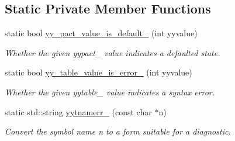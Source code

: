 \subsection*{Static Private Member Functions}
\begin{DoxyCompactItemize}
\item 
static bool \hyperlink{classyy_1_1CParser_a5f9d648c80542a6de735c18d99fa3633}{yy\-\_\-pact\-\_\-value\-\_\-is\-\_\-default\-\_\-} (int yyvalue)
\begin{DoxyCompactList}\small\item\em Whether the given {\ttfamily yypact\-\_\-} value indicates a defaulted state. \end{DoxyCompactList}\item 
static bool \hyperlink{classyy_1_1CParser_a3cbbb281125852d66bd6552341c67042}{yy\-\_\-table\-\_\-value\-\_\-is\-\_\-error\-\_\-} (int yyvalue)
\begin{DoxyCompactList}\small\item\em Whether the given {\ttfamily yytable\-\_\-} value indicates a syntax error. \end{DoxyCompactList}\item 
\hypertarget{classyy_1_1CParser_abbd6d13f128491c16c982c11faae4bf7}{static std\-::string \hyperlink{classyy_1_1CParser_abbd6d13f128491c16c982c11faae4bf7}{yytnamerr\-\_\-} (const char $\ast$n)}\label{classyy_1_1CParser_abbd6d13f128491c16c982c11faae4bf7}

\begin{DoxyCompactList}\small\item\em Convert the symbol name {\itshape n} to a form suitable for a diagnostic. \end{DoxyCompactList}\end{DoxyCompactItemize}
